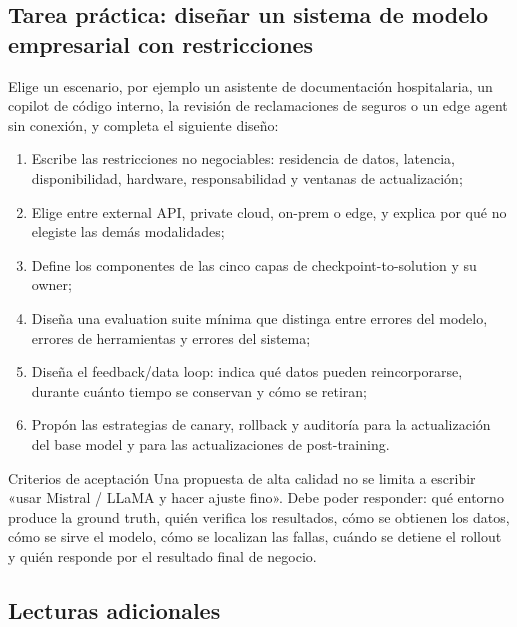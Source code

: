 \subsection{Tarea práctica: diseñar un sistema de modelo empresarial con restricciones}

Elige un escenario, por ejemplo un asistente de documentación hospitalaria, un copilot de código interno, la revisión de reclamaciones de seguros o un edge agent sin conexión, y completa el siguiente diseño:

\begin{enumerate}
  \item Escribe las restricciones no negociables: residencia de datos, latencia, disponibilidad, hardware, responsabilidad y ventanas de actualización;
  \item Elige entre external API, private cloud, on-prem o edge, y explica por qué no elegiste las demás modalidades;
  \item Define los componentes de las cinco capas de checkpoint-to-solution y su owner;
  \item Diseña una evaluation suite mínima que distinga entre errores del modelo, errores de herramientas y errores del sistema;
  \item Diseña el feedback/data loop: indica qué datos pueden reincorporarse, durante cuánto tiempo se conservan y cómo se retiran;
  \item Propón las estrategias de canary, rollback y auditoría para la actualización del base model y para las actualizaciones de post-training.
\end{enumerate}

\begin{knowledgebox}{Criterios de aceptación}
Una propuesta de alta calidad no se limita a escribir «usar Mistral / LLaMA y hacer ajuste fino». Debe poder responder: qué entorno produce la ground truth, quién verifica los resultados, cómo se obtienen los datos, cómo se sirve el modelo, cómo se localizan las fallas, cuándo se detiene el rollout y quién responde por el resultado final de negocio.
\end{knowledgebox}

\subsection{Lecturas adicionales}

